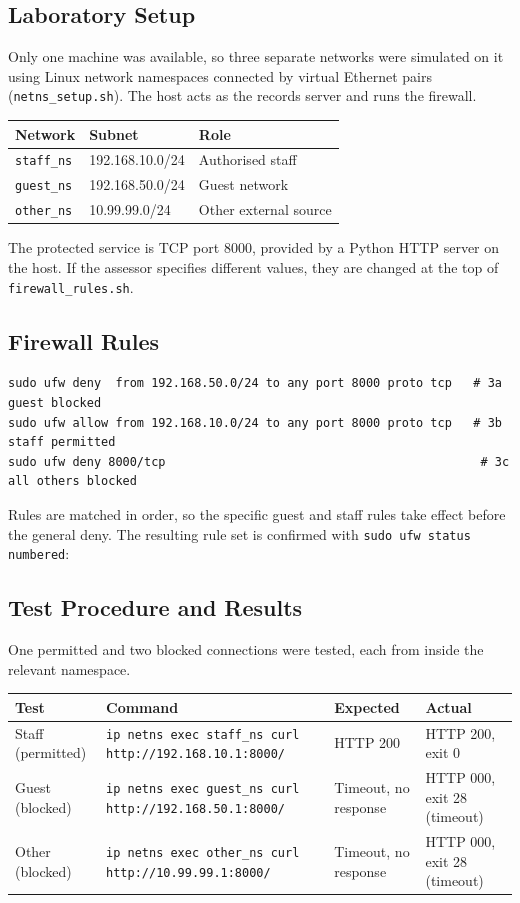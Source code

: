\documentclass[11pt]{article}
\begin{document}
\subsection{Laboratory Setup}
Only one machine was available, so three separate networks were simulated on it using Linux network namespaces connected by virtual Ethernet pairs (\texttt{netns\_setup.sh}). The host acts as the records server and runs the firewall.

\begin{center}
\begin{tabular}{lll}
\toprule
Network & Subnet & Role \\
\midrule
\texttt{staff\_ns} & 192.168.10.0/24 & Authorised staff \\
\texttt{guest\_ns} & 192.168.50.0/24 & Guest network \\
\texttt{other\_ns} & 10.99.99.0/24 & Other external source \\
\bottomrule
\end{tabular}
\end{center}
The protected service is TCP port 8000, provided by a Python HTTP server on the host. If the assessor specifies different values, they are changed at the top of \texttt{firewall\_rules.sh}.

\subsection{Firewall Rules}
\begin{lstlisting}
sudo ufw deny  from 192.168.50.0/24 to any port 8000 proto tcp   # 3a guest blocked
sudo ufw allow from 192.168.10.0/24 to any port 8000 proto tcp   # 3b staff permitted
sudo ufw deny 8000/tcp                                            # 3c all others blocked
\end{lstlisting}
Rules are matched in order, so the specific guest and staff rules take effect before the general deny. The resulting rule set is confirmed with \texttt{sudo ufw status numbered}:



\subsection{Test Procedure and Results}
One permitted and two blocked connections were tested, each from inside the relevant namespace.

\begin{longtable}{p{2.6cm}p{6cm}p{2.6cm}p{2.6cm}}
\toprule
Test & Command & Expected & Actual \\
\midrule
\endhead
Staff (permitted) & \texttt{ip netns exec staff\_ns curl http://192.168.10.1:8000/} & HTTP 200 & HTTP 200, exit 0 \\
Guest (blocked) & \texttt{ip netns exec guest\_ns curl http://192.168.50.1:8000/} & Timeout, no response & HTTP 000, exit 28 (timeout) \\
Other (blocked) & \texttt{ip netns exec other\_ns curl http://10.99.99.1:8000/} & Timeout, no response & HTTP 000, exit 28 (timeout) \\
\bottomrule
\end{longtable}
\end{document}
